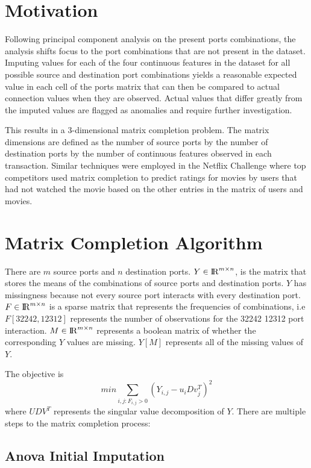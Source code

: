 \documentclass[12pt,twoside]{dukestatscithesis}
\theoremstyle{definition}
\theoremstyle{definition}
\theoremstyle{definition}
\theoremstyle{remark}
\begin{document}
\section{Motivation}\label{motivation-1}

Following principal component analysis on the present ports
combinations, the analysis shifts focus to the port combinations that
are not present in the dataset. Imputing values for each of the four
continuous features in the dataset for all possible source and
destination port combinations yields a reasonable expected value in each
cell of the ports matrix that can then be compared to actual connection
values when they are observed. Actual values that differ greatly from
the imputed values are flagged as anomalies and require further
investigation.

This results in a 3-dimensional matrix completion problem. The matrix
dimensions are defined as the number of source ports by the number of
destination ports by the number of continuous features observed in each
transaction. Similar techniques were employed in the Netflix Challenge
where top competitors used matrix completion to predict ratings for
movies by users that had not watched the movie based on the other
entries in the matrix of users and movies.

\section{Matrix Completion Algorithm}\label{matrix-completion-algorithm}

There are \(m\) source ports and \(n\) destination ports.
\(Y \in {\rm I\!R}^{m \times n}\), is the matrix that stores the means
of the combinations of source ports and destination ports. \(Y\) has
missingness because not every source port interacts with every
destination port. \(F \in {\rm I\!R}^{m \times n}\) is a sparse matrix
that represents the frequencies of combinations, i.e \(F[32242,12312]\)
represents the number of observations for the 32242 12312 port
interaction. \(M \in {\rm I\!R}^{m \times n}\) represents a boolean
matrix of whether the corresponding \(Y\) values are missing. \(Y[M]\)
represents all of the missing values of \(Y\).

The objective is \[min \sum_{i,j:F_{i,j} > 0} (Y_{i,j} - u_iDv^T_j)^2\]
where \(UDV^T\) represents the singular value decomposition of \(Y\).
There are multiple steps to the matrix completion process:

\subsection{Anova Initial Imputation}\label{anova-initial-imputation}
\end{document}
